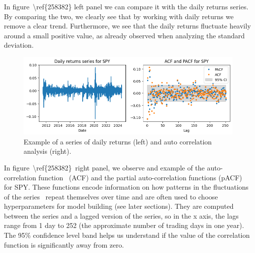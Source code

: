 \documentclass[10pt]{article}
\begin{document}
In figure~{\textbackslash ref\{258382\}} left panel we can compare it
with the daily returns series. By comparing the two, we clearly see that
by working with daily returns we remove a clear trend. Furthermore, we
see that the daily returns fluctuate heavily around a small positive
value, as already observed when analyzing the standard deviation.
\begin{figure}[H]
\begin{center}
\includegraphics[width=0.98\columnwidth]{figures/output6/output6}
\caption{{Example of a series of daily returns (left) and auto correlation
analysis (right).
{\label{258382}}%
}}
\end{center}
\end{figure}

In figure~{\textbackslash ref\{258382\}}~right panel, we observe and
example of the auto-correlation function~ (ACF) and the partial
auto-correlation functions (pACF) for SPY. These functions encode
information on how patterns in the fluctuations of the series~ repeat
themselves over time and are often used to choose hyperparameters for
model building (see later sections). They are computed between the
series and a lagged version of the series, so in the x axis, the lags
range from 1 day to 252 (the approximate number of trading days in one
year). The 95\% confidence level band helps us understand if the value
of the correlation function is significantly away from zero.~
\end{document}
